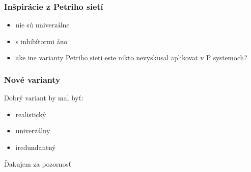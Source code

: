 \documentclass{beamer}
\begin{document}
\begin{frame}[t]\frametitle{Inšpirácie z Petriho sietí}
\begin{itemize}
  \item nie sú univerzálne
  \item s inhibítormi áno
  \item ake ine varianty Petriho sieti este nikto nevyskusal aplikovat v P systemoch?
\end{itemize}
\end{frame}

\begin{frame}[t]\frametitle{Nové varianty}
Dobrý variant by mal byť:
\begin{itemize}
  \item realistický
  \item univerzálny
  \item iredundantný
\end{itemize}
\end{frame}


\begin{frame}[t]
Ďakujem za pozornosť
\end{frame}
\end{document}
